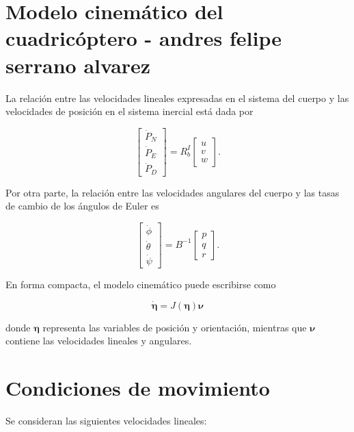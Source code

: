 \documentclass[11pt,a4paper]{article}
\begin{document}
\section*{Modelo cinemático del cuadricóptero - andres felipe serrano alvarez}

La relación entre las velocidades lineales expresadas en el sistema
del cuerpo y las velocidades de posición en el sistema inercial está
dada por

\begin{equation}
\begin{bmatrix}
\dot{P}_N \\
\dot{P}_E \\
\dot{P}_D
\end{bmatrix}
=
R_b^I
\begin{bmatrix}
u\\
v\\
w
\end{bmatrix}.
\end{equation}

Por otra parte, la relación entre las velocidades angulares del cuerpo
y las tasas de cambio de los ángulos de Euler es

\begin{equation}
\begin{bmatrix}
\dot{\phi}\\
\dot{\theta}\\
\dot{\psi}
\end{bmatrix}
=
B^{-1}
\begin{bmatrix}
p\\
q\\
r
\end{bmatrix}.
\end{equation}

En forma compacta, el modelo cinemático puede escribirse como

\begin{equation}
\boxed{
\dot{\bm{\eta}}
=
J(\bm{\eta})\bm{\nu}
}
\end{equation}

donde $\bm{\eta}$ representa las variables de posición y orientación,
mientras que $\bm{\nu}$ contiene las velocidades lineales y angulares.


\section*{Condiciones de movimiento}

Se consideran las siguientes velocidades lineales:
\end{document}
